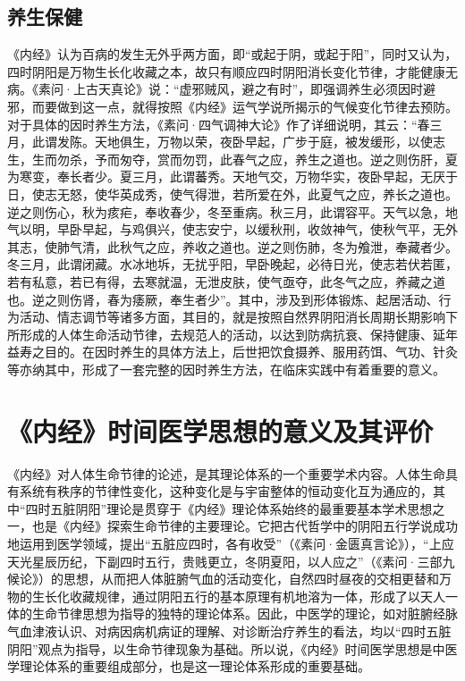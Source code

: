 \documentclass[draft,12pt]{ctexbook}
\begin{document}
\subsection{养生保健}%

《内经》认为百病的发生无外乎两方面，即“或起于阴，或起于阳”，同时又认为，四时阴阳是万物生长化收藏之本，故只有顺应四时阴阳消长变化节律，才能健康无病。《素问·上古天真论》说：“虚邪贼风，避之有时”，即强调养生必须因时避邪，而要做到这一点，就得按照《内经》运气学说所揭示的气候变化节律去预防。对于具体的因时养生方法，《素问·四气调神大论》作了详细说明，其云：“春三月，此谓发陈。天地俱生，万物以荣，夜卧早起，广步于庭，被发缓形，以使志生，生而勿杀，予而匆夺，赏而勿罚，此春气之应，养生之道也。逆之则伤肝，夏为寒变，奉长者少。夏三月，此谓蕃秀。天地气交，万物华实，夜卧早起，无厌于日，使志无怒，使华英成秀，使气得泄，若所爱在外，此夏气之应，养长之道也。逆之则伤心，秋为痎疟，奉收春少，冬至重病。秋三月，此谓容平。天气以急，地气以明，早卧早起，与鸡俱兴，使志安宁，以缓秋刑，收敛神气，使秋气平，无外其志，使肺气清，此秋气之应，养收之道也。逆之则伤肺，冬为飧泄，奉藏者少。冬三月，此谓闭藏。水冰地坼，无扰乎阳，早卧晚起，必待日光，使志若伏若匿，若有私意，若已有得，去寒就温，无泄皮肤，使气亟夺，此冬气之应，养藏之道也。逆之则伤肾，春为痿厥，奉生者少”。其中，涉及到形体锻炼、起居活动、行为活动、情志调节等诸多方面，其目的，就是按照自然界阴阳消长周期长期影响下所形成的人体生命活动节律，去规范人的活动，以达到防病抗衰、保持健康、延年益寿之目的。在因时养生的具体方法上，后世把饮食摄养、服用药饵、气功、针灸等亦纳其中，形成了一套完整的因时养生方法，在临床实践中有着重要的意义。

\section{《内经》时间医学思想的意义及其评价}%

《内经》对人体生命节律的论述，是其理论体系的一个重要学术内容。人体生命具有系统有秩序的节律性变化，这种变化是与宇宙整体的恒动变化互为通应的，其中“四时五脏阴阳”理论是贯穿于《内经》理论体系始终的最重要基本学术思想之一，也是《内经》探索生命节律的主要理论。它把古代哲学中的阴阳五行学说成功地运用到医学领域，提出“五脏应四时，各有收受”（《素问·金匮真言论》），“上应天光星辰历纪，下副四时五行，贵贱更立，冬阴夏阳，以人应之”（《素问·三部九候论》）的思想，从而把人体脏腑气血的活动变化，自然四时昼夜的交相更替和万物的生长化收藏规律，通过阴阳五行的基本原理有机地溶为一体，形成了以天人一体的生命节律思想为指导的独特的理论体系。因此，中医学的理论，如对脏腑经脉气血津液认识、对病因病机病证的理解、对诊断治疗养生的看法，均以“四时五脏阴阳”观点为指导，以生命节律现象为基础。所以说，《内经》时间医学思想是中医学理论体系的重要组成部分，也是这一理论体系形成的重要基础。
\end{document}
